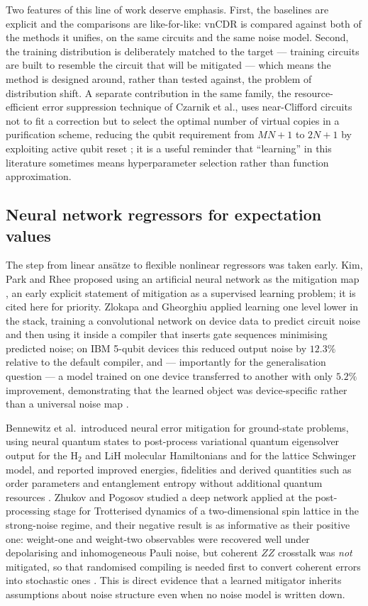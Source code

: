 \documentclass[Thesis.tex]{subfiles}
\begin{document}
Two features of this line of work deserve emphasis. First, the baselines are
explicit and the comparisons are like-for-like: vnCDR is compared against both
of the methods it unifies, on the same circuits and the same noise model.
Second, the training distribution is deliberately matched to the target ---
training circuits are built to resemble the circuit that will be mitigated ---
which means the method is designed around, rather than tested against, the
problem of distribution shift. A separate contribution in the same family,
the resource-efficient error suppression technique of Czarnik et al., uses
near-Clifford circuits not to fit a correction but to select the optimal number
of virtual copies in a purification scheme, reducing the qubit requirement from
$MN+1$ to $2N+1$ by exploiting active qubit reset
\cite{czarnik2021qubit}; it is a useful reminder that ``learning'' in this
literature sometimes means hyperparameter selection rather than function
approximation.

\subsection{Neural network regressors for expectation values}

The step from linear ans\"atze to flexible nonlinear regressors was taken
early. Kim, Park and Rhee proposed using an artificial neural network as the
mitigation map \cite{kim2020ann}, an early explicit statement of mitigation as
a supervised learning problem; it is cited here for priority. Zlokapa and
Gheorghiu applied learning one level lower in the stack, training a
convolutional network on device data to predict circuit noise and then using it
inside a compiler that inserts gate sequences minimising predicted noise; on
IBM 5-qubit devices this reduced output noise by $12.3\%$ relative to the
default compiler, and --- importantly for the generalisation question --- a
model trained on one device transferred to another with only $5.2\%$
improvement, demonstrating that the learned object was device-specific rather
than a universal noise map \cite{zlokapa2020deep}.

Bennewitz et al.\ introduced neural error mitigation for ground-state problems,
using neural quantum states to post-process variational quantum eigensolver
output for the H$_{2}$ and LiH molecular Hamiltonians and for the lattice
Schwinger model, and reported improved energies, fidelities and derived
quantities such as order parameters and entanglement entropy without
additional quantum resources \cite{bennewitz2022neural}. Zhukov and Pogosov
studied a deep network applied at the post-processing stage for Trotterised
dynamics of a two-dimensional spin lattice in the strong-noise regime, and
their negative result is as informative as their positive one: weight-one and
weight-two observables were recovered well under depolarising and
inhomogeneous Pauli noise, but coherent $ZZ$ crosstalk was \emph{not}
mitigated, so that randomised compiling \cite{wallman2016noise} is needed
first to convert coherent errors into stochastic ones
\cite{zhukov2024quantum}. This is direct evidence that a learned mitigator
inherits assumptions about noise structure even when no noise model is written
down.
\end{document}
